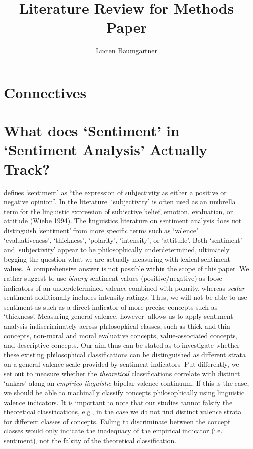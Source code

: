 \documentclass{article}
\title{Literature Review for Methods Paper}
\author{Lucien Baumgartner}
\begin{document}
\maketitle

\section{Connectives}

\section{What does `Sentiment' in `Sentiment Analysis' Actually Track?}

\citet[326]{Taboada2016} defines \enquote*{sentiment} as \enquote{the expression of subjectivity as either a positive or negative opinion}. In the literature, \enquote*{subjectivity} is often used as an umbrella term for the linguistic expression of subjective belief, emotion, evaluation, or attitude (Wiebe 1994). The linguistics literature on sentiment analysis does not distinguish \enquote*{sentiment} from more specific terms such as \enquote*{valence}, \enquote*{evaluativeness}, \enquote*{thickness}, \enquote*{polarity}, \enquote*{intensity}, or \enquote*{attitude}. Both \enquote*{sentiment} and \enquote*{subjectivity} appear to be philosophically underdetermined, ultimately begging the question what we are actually measuring with lexical sentiment values. A comprehensive answer is not possible within the scope of this paper. We rather suggest to use \textit{binary} sentiment values (positive/negative) as loose indicators of an underdetermined valence combined with polarity, whereas \textit{scalar} sentiment additionally includes intensity ratings. Thus, we will not be able to use sentiment as such as a direct indicator of more precise concepts such as \enquote*{thickness}. Measuring general valence, however, allows us to apply sentiment analysis indiscriminately across philosophical classes, such as thick and thin concepts, non-moral and moral evaluative concepts, value-associated concepts, and descriptive concepts. Our aim thus can be stated as to investigate whether these existing philosophical classifications can be distinguished as different strata on a general valence scale provided by  sentiment indicators. Put differently, we set out to measure whether the \textit{theoretical} classifications correlate with distinct \enquote*{ankers} along an \textit{empirico-linguistic} bipolar valence continuum. If this is the case, we should be able to machinally classify concepts philosophically using linguistic valence indicators. It is important to note that our studies cannot falsify the theoretical classifications, e.g., in the case we do not find distinct valence strata for different classes of concepts. Failing to discriminate between the concept classes would only indicate the inadequacy of the empirical indicator (i.e. sentiment), not the falsity of the theoretical classification.
\end{document}
